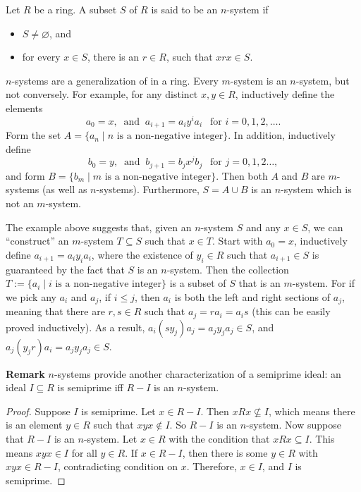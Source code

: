 \documentclass[12pt]{article}
\begin{document}
Let $R$ be a ring.  A subset $S$ of $R$ is said to be an $n$-system if 
\begin{itemize}
\item $S\ne \varnothing$, and
\item for every $x\in S$, there is an $r\in R$, such that $xrx\in S$.
\end{itemize}

$n$-systems are a generalization of  in a ring.  Every $m$-system is an $n$-system, but not conversely.  For example, for any distinct $x,y\in R$, inductively define the elements $$a_0=x,\ \mbox{ and }\ a_{i+1}=a_i y^i a_i\ \ \mbox{ for }i=0,1,2,\ldots.$$  Form the set $A=\lbrace a_n\mid n\mbox{ is a non-negative integer}\rbrace$.  In addition, inductively define $$b_0=y,\ \mbox{ and }\ b_{j+1}=b_j x^j b_j\ \ \mbox{ for }j=0,1,2\ldots,$$ and form $B=\lbrace b_m\mid m\mbox{ is a non-negative integer}\rbrace$.  Then both $A$ and $B$ are $m$-systems (as well as $n$-systems).  Furthermore, $S=A\cup B$ is an $n$-system which is not an $m$-system.

The example above suggests that, given an $n$-system $S$ and any $x\in S$, we can ``construct'' an $m$-system $T\subseteq S$ such that $x\in T$.  Start with $a_0=x$, inductively define $a_{i+1}=a_iy_ia_i$, where the existence of $y_i\in R$ such that $a_{i+1}\in S$ is guaranteed by the fact that $S$ is an $n$-system.  Then the collection $T:=\lbrace a_i\mid i\mbox{ is a non-negative integer}\rbrace$ is a subset of $S$ that is an $m$-system.  For if we pick any $a_i$ and $a_j$, if $i\le j$, then $a_i$ is both the left and right sections of $a_j$, meaning that there are $r,s\in R$ such that $a_j=ra_i=a_is$ (this can be easily proved inductively).  As a result, $a_i(sy_j)a_j=a_jy_ja_j\in S$, and $a_j(y_jr)a_i=a_jy_ja_j\in S$.

\textbf{Remark} $n$-systems provide another characterization of a semiprime ideal: an ideal $I\subseteq R$ is semiprime iff $R-I$ is an $n$-system.
\begin{proof}
Suppose $I$ is semiprime.  Let $x\in R-I$.  Then $xRx\nsubseteq I$, which means there is an element $y\in R$ such that $xyx\notin I$.  So $R-I$ is an $n$-system.  Now suppose that $R-I$ is an $n$-system.  Let $x\in R$ with the condition that $xRx\subseteq I$.  This means $xyx\in I$ for all $y\in R$.  If $x\in R-I$, then there is some $y\in R$ with $xyx\in R-I$, contradicting condition on $x$.  Therefore, $x\in I$, and $I$ is semiprime.
\end{proof}
\end{document}
